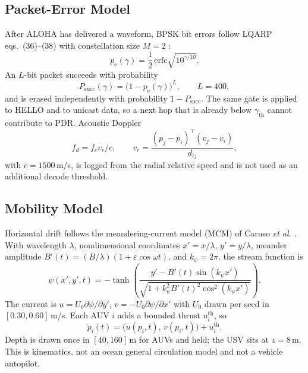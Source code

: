 \documentclass[journal]{IEEEtran}
\begin{document}
\subsection{Packet-Error Model}
After ALOHA has delivered a waveform, BPSK bit errors follow LQARP
eqs.~(36)--(38) with constellation size $M=2$ \cite{liu2026lqarp}:
\begin{equation}
p_{\mathrm{e}}(\gamma)=\frac{1}{2}\,\mathrm{erfc}\sqrt{10^{\gamma/10}}.
\label{eq:pe}
\end{equation}
An $L$-bit packet succeeds with probability
\begin{equation}
P_{\mathrm{succ}}(\gamma)=\bigl(1-p_{\mathrm{e}}(\gamma)\bigr)^{L},\qquad L=400,
\label{eq:psucc}
\end{equation}
and is erased independently with probability $1-P_{\mathrm{succ}}$.
The same gate is applied to HELLO and to unicast data, so a next hop
that is already below $\gamma_{\mathrm{th}}$ cannot contribute to PDR.
Acoustic Doppler
\begin{equation}
f_{d}=f_{c}v_{r}/c,\qquad
v_{r}=\frac{(p_j-p_i)^{\top}(v_j-v_i)}{d_{ij}},
\label{eq:doppler}
\end{equation}
with $c=1500$\,m/s, is logged from the radial relative speed and is
not used as an additional decode threshold.

\subsection{Mobility Model}
Horizontal drift follows the meandering-current model (MCM) of Caruso
\emph{et al.} \cite{caruso2008mcm}. With wavelength $\lambda$,
nondimensional coordinates $x'=x/\lambda$, $y'=y/\lambda$, meander
amplitude $B'(t)=(B/\lambda)(1+\varepsilon\cos\omega t)$, and
$k_{\psi}=2\pi$, the stream function is
\begin{equation}
\psi(x',y',t)=-\tanh\!\left(\frac{y'-B'(t)\sin(k_{\psi}x')}{\sqrt{1+k_{\psi}^{2}B'(t)^{2}\cos^{2}(k_{\psi}x')}}\right).
\label{eq:psi}
\end{equation}
The current is $u=U_0\partial\psi/\partial y'$,
$v=-U_0\partial\psi/\partial x'$
with $U_0$ drawn per seed in $[0.30,0.60]$\,m/s. Each AUV $i$ adds a
bounded thrust $u_i^{\mathrm{th}}$, so
\begin{equation}
\dot{p}_i(t)=\bigl(u(p_i,t),\,v(p_i,t)\bigr)+u_i^{\mathrm{th}}.
\label{eq:pdot}
\end{equation}
Depth is drawn once in $[40,160]$\,m for AUVs and held; the USV sits
at $z=8$\,m. This is kinematics, not an ocean general circulation
model and not a vehicle autopilot.
\end{document}
